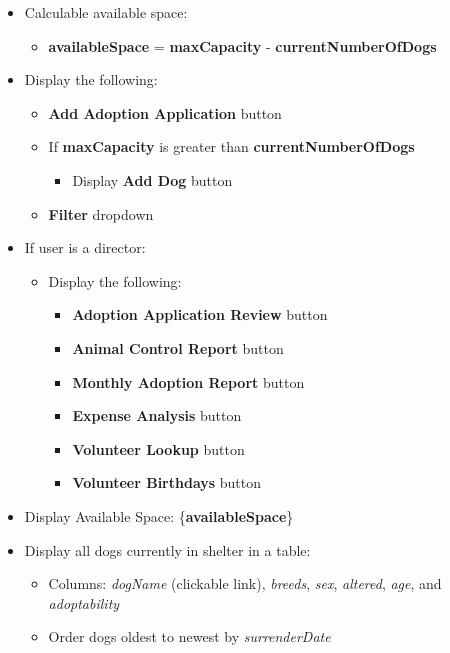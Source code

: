 \documentclass{article}
\begin{document}
\begin{itemize}
    \item Calculable available space:
    \begin{itemize}
        \item \textbf{availableSpace} = \textbf{maxCapacity} - \textbf{currentNumberOfDogs}
    \end{itemize}
    \item Display the following:
    \begin{itemize}
        \item \textbf{Add Adoption Application} button
        \item If \textbf{maxCapacity} is greater than \textbf{currentNumberOfDogs}
        \begin{itemize}
            \item Display \textbf{Add Dog} button 
        \end{itemize}
        \item \textbf{Filter} dropdown
    \end{itemize}
    \item If user is a director:
    \begin{itemize}
        \item Display the following:
        \begin{itemize}
            \item \textbf{Adoption Application Review} button
            \item \textbf{Animal Control Report} button
            \item \textbf{Monthly Adoption Report} button
            \item \textbf{Expense Analysis} button
            \item \textbf{Volunteer Lookup} button
            \item \textbf{Volunteer Birthdays} button
        \end{itemize}
    \end{itemize}
    \item Display Available Space: \{\textbf{availableSpace}\}
    \item Display all dogs currently in shelter in a table:
    \begin{itemize}
        \item Columns: \textit{dogName} (clickable link), \textit{breeds}, \textit{sex}, \textit{altered}, \textit{age}, and \textit{adoptability}
        \item Order dogs oldest to newest by \textit{surrenderDate}

\end{itemize}
\end{itemize}
\end{document}
